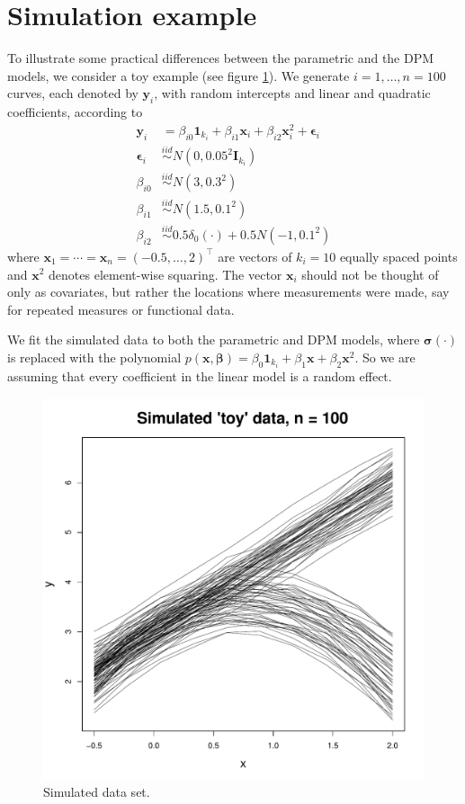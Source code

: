 \documentclass[12pt]{article}
\newcommand{\m}[1]{\mathbf{\bm{#1}}}
\begin{document}
\section{Simulation example}

To illustrate some practical differences between the parametric and the DPM models, we consider a toy example (see figure \ref{toy}). We generate $i=1,\ldots,n=100$ curves, each denoted by $\m{y}_i$, with random intercepts and linear and quadratic coefficients, according to
\begin{align*}
\m{y}_i &= \beta_{i0}\m{1}_{k_i} + \beta_{i1}\m{x}_i + \beta_{i2}\m{x}_i^2 + \m{\epsilon}_i \\
\m{\epsilon}_i &\overset{iid}\sim N(0, 0.05^2\m{I}_{k_i}) \\
\beta_{i0} &\overset{iid}\sim N(3, 0.3^2) \\
\beta_{i1} &\overset{iid}\sim N(1.5, 0.1^2) \\
\beta_{i2} &\overset{iid}\sim 0.5\delta_0(\cdot) + 0.5N(-1, 0.1^2)
\end{align*}
where $\m{x}_1=\cdots=\m{x}_n=(-0.5,\ldots,2)^\top$ are vectors of $k_i=10$ equally spaced points and $\m{x}^2$ denotes element-wise squaring. The vector $\m{x}_i$ should not be thought of only as covariates, but rather the locations where measurements were made, say for repeated measures or functional data.

We fit the simulated data to both the parametric and DPM models, where $\m{\sigma}(\cdot)$ is replaced with the polynomial $p(\m{x}, \m{\beta})=\beta_0\m{1}_{k_i}+\beta_1\m{x}+\beta_2\m{x}^2$. So we are assuming that every coefficient in the linear model is a random effect.

\begin{figure}
\begin{center}
\includegraphics[scale=0.37]{../figs/toy_data.pdf}
\caption{Simulated data set.}
\label{toy}
\end{center}
\end{figure}
\end{document}
